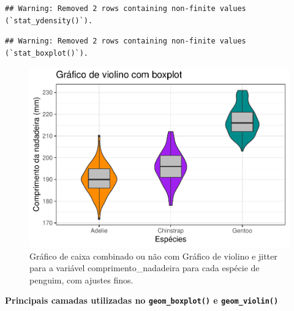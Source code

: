 \documentclass[
]{article}
\begin{document}
\begin{verbatim}
## Warning: Removed 2 rows containing non-finite values (`stat_ydensity()`).
\end{verbatim}

\begin{verbatim}
## Warning: Removed 2 rows containing non-finite values (`stat_boxplot()`).
\end{verbatim}

\begin{figure}
\centering
\includegraphics{epr_files/figure-latex/fig-boxplot-violin-fino-3.pdf}
\caption{\label{fig:fig-boxplot-violin-fino-3}Gráfico de caixa combinado ou não com Gráfico de violino e jitter para a variável comprimento\_nadadeira para cada espécie de penguim, com ajustes finos.}
\end{figure}

\textbf{Principais camadas utilizadas no \texttt{geom\_boxplot()} e \texttt{geom\_violin()}}
\end{document}
